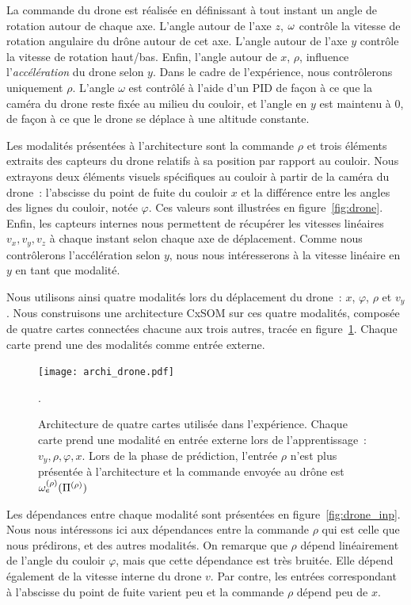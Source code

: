 \documentclass[../main]{subfiles}
\begin{document}
La commande du drone est réalisée en définissant à tout instant un angle de rotation autour de chaque axe. 
L'angle autour de l'axe $z$, $\omega$ contrôle la vitesse de rotation angulaire du drône autour de cet axe. L'angle autour de l'axe $y$ contrôle la vitesse de rotation haut/bas. Enfin, l'angle autour de $x$, $\rho$, influence l'\emph{accélération} du drone selon $y$.
Dans le cadre de l'expérience, nous contrôlerons uniquement $\rho$. L'angle $\omega$ est contrôlé à l'aide d'un PID de façon à ce que la caméra du drone reste fixée au milieu du couloir, et l'angle en $y$ est maintenu à 0, de façon à ce que le drone se déplace à une altitude constante.

Les modalités présentées à l'architecture sont la commande $\rho$ et trois éléments extraits des capteurs du drone relatifs à sa position par rapport au couloir.
Nous extrayons deux éléments visuels spécifiques au couloir à partir de la caméra du drone~: l'abscisse du point de fuite du couloir $x$ et la différence entre les angles des lignes du couloir, notée $\varphi$.
Ces valeurs sont illustrées en figure~\ref{fig:drone}.
Enfin, les capteurs internes nous permettent de récupérer les vitesses linéaires $v_x,v_y,v_z$ à chaque instant selon chaque axe de déplacement. Comme nous contrôlerons l'accélération selon $y$, nous nous intéresserons à la vitesse linéaire en $y$ en tant que modalité.

Nous utilisons ainsi quatre modalités lors du déplacement du drone~: $x$, $\varphi$, $\rho$ et $v_y$.
Nous construisons une architecture CxSOM sur ces quatre modalités, composée de quatre cartes connectées chacune aux trois autres, tracée en figure~\ref{fig:archi_drone}. Chaque carte prend une des modalités comme entrée externe.


\begin{figure}
	\centering\texttt{[image: archi\_drone.pdf]}
	\caption{Architecture de quatre cartes utilisée dans l'expérience. Chaque carte prend une modalité en entrée externe lors de l'apprentissage~: $v_y,\rho,\varphi,x$. Lors de la phase de prédiction, l'entrée $\rho$ n'est plus présentée à l'architecture et la commande envoyée au drône est $\omega_e^{({\rho})}(\Pi^{({\rho})})$\label{fig:archi_drone}}.
\end{figure}

Les dépendances entre chaque modalité sont présentées en figure~\ref{fig:drone_inp}. Nous nous intéressons ici aux dépendances entre la commande $\rho$ qui est celle que nous prédirons, et des autres modalités.
On remarque que $\rho$ dépend linéairement de l'angle du couloir $\varphi$, mais que cette dépendance est très bruitée. Elle dépend également de la vitesse interne du drone $v$. Par contre, les entrées correspondant à l'abscisse du point de fuite varient peu et la commande $\rho$ dépend peu de $x$.
\end{document}
